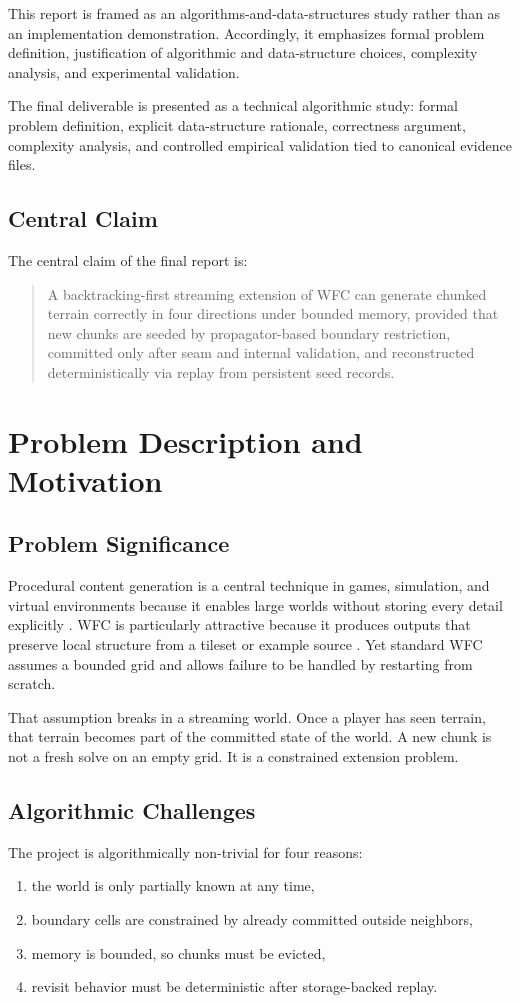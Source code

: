 \documentclass[12pt,a4paper]{report}
\begin{document}
This report is framed as an algorithms-and-data-structures study rather than as an implementation demonstration. Accordingly, it emphasizes formal problem definition, justification of algorithmic and data-structure choices, complexity analysis, and experimental validation.

The final deliverable is presented as a technical algorithmic study: formal problem definition, explicit data-structure rationale, correctness argument, complexity analysis, and controlled empirical validation tied to canonical evidence files.

\section*{Central Claim}
The central claim of the final report is:
\begin{quote}
A backtracking-first streaming extension of WFC can generate chunked terrain correctly in four directions under bounded memory, provided that new chunks are seeded by propagator-based boundary restriction, committed only after seam and internal validation, and reconstructed deterministically via replay from persistent seed records.
\end{quote}

\chapter{Problem Description and Motivation}
\section{Problem Significance}
Procedural content generation is a central technique in games, simulation, and virtual environments because it enables large worlds without storing every detail explicitly \cite{shaker2016pcg}. WFC is particularly attractive because it produces outputs that preserve local structure from a tileset or example source \cite{gumin2016wfc,karth2022wfc}. Yet standard WFC assumes a bounded grid and allows failure to be handled by restarting from scratch.

That assumption breaks in a streaming world. Once a player has seen terrain, that terrain becomes part of the committed state of the world. A new chunk is not a fresh solve on an empty grid. It is a constrained extension problem.

\section{Algorithmic Challenges}
The project is algorithmically non-trivial for four reasons:
\begin{enumerate}
\item the world is only partially known at any time,
\item boundary cells are constrained by already committed outside neighbors,
\item memory is bounded, so chunks must be evicted,
\item revisit behavior must be deterministic after storage-backed replay.
\end{enumerate}
\end{document}
